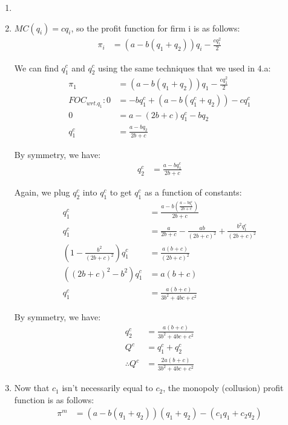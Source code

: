 \documentclass[12pt,letterpaper]{article}
\begin{document}
\begin{enumerate}
\begin{enumerate}
    \item 
    
    \item $MC(q_i) = cq_i$, so the profit function for firm i is as follows:
    \begin{align*}
        \pi_i &= (a - b(q_1 + q_2))q_i - \frac{cq_i^2}{2}
    \end{align*}
    
    We can find $q_1^c$ and $q_2^c$ using the same techniques that we used in 4.a:
    \begin{align*}
        \pi_1 &= (a - b(q_1 + q_2))q_1 - \frac{cq_1^2}{2}\\
        FOC_{wrt.q_1}: 0 &= -bq_1^c + (a-b(q_1^c + q_2)) - cq_1^c\\
        0 &= a - (2b + c)q_1^c - bq_2\\
        q_1^c &= \frac{a - bq_2}{2b + c}
    \end{align*}
    
    By symmetry, we have:
    \begin{align*}
        q_2^c &= \frac{a - bq_1^c}{2b + c}
    \end{align*}
    
    Again, we plug $q_2^c$ into $q_1^c$ to get $q_1^c$ as a function of constants:
    \begin{align*}
        q_1^c &= \frac{a - b(\frac{a - bq_1^c}{2b + c})}{2b + c}\\
        q_1^c &= \frac{a}{2b+c} - \frac{ab}{(2b+c)^2} + \frac{b^2q_1^c}{(2b+c)^2}\\
        (1-\frac{b^2}{(2b+c)^2})q_1^c &= \frac{a(b+c)}{(2b+c)^2}\\
        ((2b+c)^2 - b^2)q_1^c &= a(b+c)\\
        q_1^c &= \frac{a(b+c)}{3b^2 + 4bc + c^2}
    \end{align*}
    
    By symmetry, we have:
    \begin{align*}
        q_2^c &= \frac{a(b+c)}{3b^2 + 4bc + c^2}\\
        Q^c &= q_1^c + q_2^c\\
        \therefore Q^c &= \frac{2a(b+c)}{3b^2 + 4bc + c^2}
    \end{align*}
    
    \item Now that $c_1$ isn't necessarily equal to $c_2$, the monopoly (collusion) profit function is as follows:
    \begin{align*}
        \pi^m &= (a-b(q_1 + q_2))(q_1 + q_2) - (c_1q_1 + c_2q_2)
    \end{align*}

\end{enumerate}


\end{enumerate}
	
\end{document}
